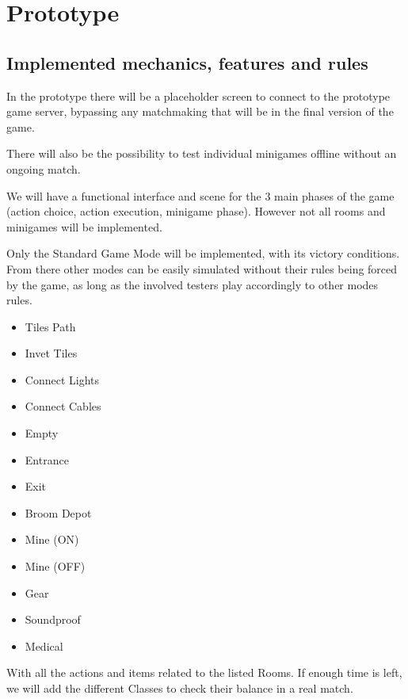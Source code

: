 \section{Prototype}

\subsection{Implemented mechanics, features and rules}
In the prototype there will be a placeholder screen to connect to the prototype game server, bypassing any matchmaking that will be in the final version of the game.

There will also be the possibility to test individual minigames offline without an ongoing match.

We will have a functional interface and scene for the 3 main phases of the game (action choice, action execution, minigame phase).
However not all rooms and minigames will be implemented.

Only the Standard Game Mode will be implemented, with its victory conditions. From there other modes can be easily simulated without their rules being forced by the game, as long as the involved testers play accordingly to other modes rules.

\begin{itemize}
	\item Tiles Path
	\item Invet Tiles
	\item Connect Lights
	\item Connect Cables
\end{itemize}

\begin{itemize}
	\item Empty
	\item Entrance
	\item Exit
	\item Broom Depot
	\item Mine (ON)
	\item Mine (OFF)
	\item Gear
	\item Soundproof
	\item Medical
\end{itemize}

With all the actions and items related to the listed Rooms.
If enough time is left, we will add the different Classes to check their balance in a real match.

\pagebreak

